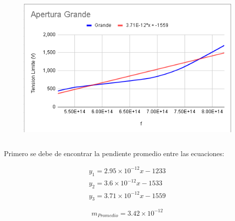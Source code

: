 \documentclass[letterpaper, 12pt]{article}
\begin{document}
\begin{figure}[H]
      \begin{center}
            \includegraphics[width=.7\linewidth]{Images/SuperposicionGrande.png}
            \caption{}
      \end{center}
\end{figure}

\subsection{}

Primero se debe de encontrar la pendiente promedio entre
las ecuaciones:

\begin{equation*}
      \begin{gathered}
            y_{1} = 2.95 \times 10^{-12} x - 1233 \\
            y_{2} = 3.6 \times 10^{-12} x - 1533 \\
            y_3 = 3.71 \times 10^{-12} x - 1559
      \end{gathered}
\end{equation*}

\begin{equation*}
      m_{Promedio} = 3.42 \times 10^{-12}
\end{equation*}
\end{document}
